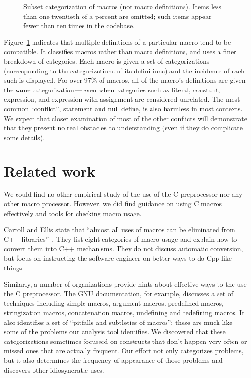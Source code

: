 \documentclass[11pt]{article}
\begin{document}
\begin{figure}
{\small\centerline{}}
\caption{Subset categorization of macros (not macro definitions).   Items
  less than one twentieth of a percent are omitted; such items appear
  fewer than ten times in the codebase.}
\label{fig:subset-categories}
\end{figure}
 
Figure~\ref{fig:subset-categories} indicates that multiple definitions of a
particular macro tend to be compatible.  It classifies macros rather than
macro definitions, and uses a finer breakdown of categories.  Each macro is
given a set of categorizations (corresponding to the categorizations of its
definitions) and the incidence of each such is displayed.  For over 97\% of
macros, all of the macro's definitions are given the same
categorization\,---\,even when categories such as literal, constant,
expression, and expression with assignment are considered unrelated.  The
most common ``conflict'', statement and null define, is also harmless in
most contexts.  We expect that closer examination of most of the other
conflicts will demonstrate that they present no real obstacles to
understanding (even if they do complicate some details).


\section{Related work}
\label{sec:related}

We could find no other empirical study of the use of the C preprocessor nor
any other macro processor.  However, we did find guidance on using C macros
effectively and tools for checking macro usage.

Carroll and Ellis state that ``almost all uses of macros can be eliminated
from C++ libraries''~\cite[p.~146]{Carroll95}.  They list eight categories
of macro usage and explain how to convert them into C++ mechanisms.  They
do not discuss automatic conversion, but focus on instructing the software
engineer on better ways to do Cpp-like things.

Similarly, a number of organizations provide hints about effective ways to
the use the C preprocessor.  The GNU documentation, for example, discusses
a set of techniques including simple macros, argument macros, predefined
macros, stringization macros, concatenation macros, undefining and
redefining macros.  It also identifies a set of ``pitfalls and subtleties
of macros''; these are much like some of the problems our analysis tool
identifies.  We discovered that these categorizations sometimes focussed on
constructs that don't happen very often or missed ones that are actually
frequent.  Our effort not only categorizes problems, but it also determines
the frequency of appearance of those problems and discovers other
idiosyncratic uses.
\end{document}
